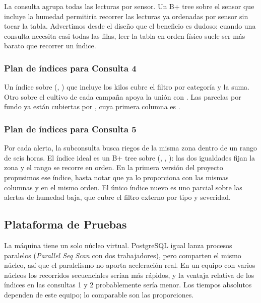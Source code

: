 La consulta agrupa todas las lecturas por sensor. Un B+ tree sobre el sensor que incluye la humedad permitiría recorrer las lecturas ya ordenadas por sensor sin tocar la tabla. Advertimos desde el diseño que el beneficio es dudoso: cuando una consulta necesita casi todas las filas, leer la tabla en orden físico suele ser más barato que recorrer un índice.


\subsubsection{Plan de índices para Consulta 4}

Un índice sobre (, ) que incluye los kilos cubre el filtro por categoría y la suma. Otro sobre el cultivo de cada campaña apoya la unión con . Las parcelas por fundo ya están cubiertas por , cuya primera columna es .


\subsubsection{Plan de índices para Consulta 5}

Por cada alerta, la subconsulta busca riegos de la misma zona dentro de un rango de seis horas. El índice ideal es un B+ tree sobre (, , ): las dos igualdades fijan la zona y el rango se recorre en orden. En la primera versión del proyecto propusimos ese índice, hasta notar que  ya lo proporciona con las mismas columnas y en el mismo orden. El único índice nuevo es uno parcial sobre las alertas de humedad baja, que cubre el filtro externo por tipo y severidad.


\subsection{Plataforma de Pruebas}


La máquina tiene un solo núcleo virtual. PostgreSQL igual lanza procesos paralelos (\emph{Parallel Seq Scan} con dos trabajadores), pero comparten el mismo núcleo, así que el paralelismo no aporta aceleración real. En un equipo con varios núcleos los recorridos secuenciales serían más rápidos, y la ventaja relativa de los índices en las consultas 1 y 2 probablemente sería menor. Los tiempos absolutos dependen de este equipo; lo comparable son las proporciones.

